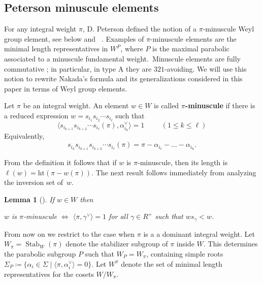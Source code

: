 \documentclass[11pt]{article}
\newtheorem{lemma}[theo]{Lemma}
\theoremstyle{definition}
\numberwithin{equation}{section}
\newcommand{\h}{\mathrm{ht}}
\DeclareMathOperator{\Stab}{Stab}
\begin{document}
\subsection{Peterson minuscule elements}\label{sec:minuscule} 
For any integral weight $\pi$, D. Peterson defined the notion of a $\pi$-minuscule 
Weyl group element, see below and ~\cite{proctor:bruhat,carrell:vector,proctor:minuscule,stembridge:fullycomm,stembridge2001minuscule,graham.kreiman:cominuscule_pt}.
Examples of $\pi$-minuscule elements are the minimal length representatives in $W^P$, where
$P$ is the maximal parabolic associated to a minuscule fundamental weight.~{Minuscule elements are fully commutative
	\cite{stembridge:fullycomm}; in particular, in type A they are $321$-avoiding.}
We will use this notion to rewrite Nakada's formula and its generalizations considered in this paper in terms of Weyl group elements. 
\begin{defin}\label{def:minuscule}
	Let $\pi$ be an integral weight.
	An element \mbox{$w\in W$} is called {\bf $\pi$-minuscule} if
	there is a reduced expression $w=s_{i_1} s_{i_2}\cdots s_{i_\ell}$ such that
	\begin{equation}\label{minuscule:1}
		\langle s_{i_{k+1}} s_{i_{k+2}}\cdots s_{i_\ell}(\pi), \alpha_{i_k}^\vee \rangle=1\hspace{1cm} (1\leq k\leq \ell)
	\end{equation}
	Equivalently, 
	\begin{equation}\label{equ:actiononmin}
		s_{i_k} s_{i_{k+1}} s_{i_{k+2}}\cdots s_{i_\ell}(\pi) = \pi - \alpha_{i_\ell} - \ldots - \alpha_{i_k}.
	\end{equation}
\end{defin}
From the definition it follows that if $w$ is $\pi$-minuscule, then its length is $\ell(w) = \h(\pi- w(\pi))$.  
The next result follows immediately from analyzing the inversion set of~$w$. 
\begin{lemma}[{\cite[Proposition 5.1]{stembridge2001minuscule}}]\label{lem:gamma}
	If $w\in W$ then
	\begin{center}
		$w$ is $\pi$-minuscule $\iff$ $\langle\pi, \gamma^\vee\rangle=1$ for all $\gamma\in R^{+}$
		such that $w s_\gamma <w$.
	\end{center}
\end{lemma}
From now on we restrict to the case when $\pi$ is a a dominant integral weight. Let~$W_\pi=\Stab_W(\pi)$ denote the stabilizer subgroup of $\pi$ inside $W$. This determines the parabolic subgroup $P$ such that $W_P=W_\pi$, containing simple roots \mbox{$\Sigma_P\coloneqq \{\alpha_i\in \Sigma\mid \langle \pi,\alpha_i^\vee\rangle=0\}$}. Let $W^\pi$ denote the set of minimal length representatives for the cosets $W/W_\pi$.
\end{document}
